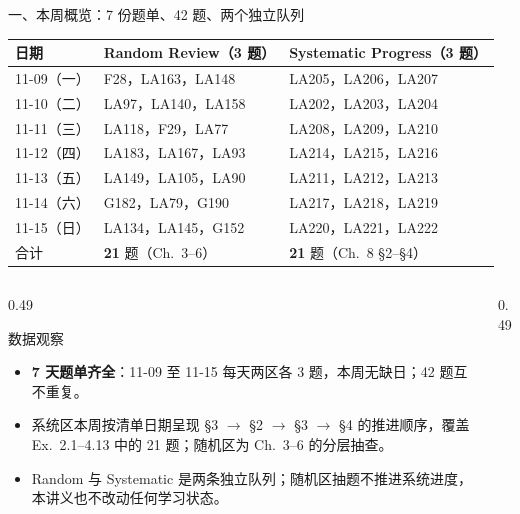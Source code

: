 \documentclass[aspectratio=169,10pt,fontset=none]{ctexbeamer}
\begin{document}
\begin{frame}[t]{一、本周概览：7 份题单、42 题、两个独立队列}
  \label{sec:overview}
  \centering
  \scriptsize
  \setlength{\tabcolsep}{3pt}
  \renewcommand{\arraystretch}{1.14}
  \begin{tabular}{@{}l l l@{}}
    \toprule
    日期 & Random Review（3 题） & Systematic Progress（3 题）\\
    \midrule
    11-09（一） & F28，LA163，LA148 & LA205，LA206，LA207\\
    11-10（二） & LA97，LA140，LA158 & LA202，LA203，LA204\\
    11-11（三） & LA118，F29，LA77 & LA208，LA209，LA210\\
    11-12（四） & LA183，LA167，LA93 & LA214，LA215，LA216\\
    11-13（五） & LA149，LA105，LA90 & LA211，LA212，LA213\\
    \rowcolor{ink!7} 11-14（六） & G182，LA79，G190 & LA217，LA218，LA219\\
    \rowcolor{ink!7} 11-15（日） & LA134，LA145，G152 & LA220，LA221，LA222\\
    \midrule
    合计 & \textbf{21} 题（Ch.~3--6） & \textbf{21} 题（Ch.~8 \S2--\S4）\\
    \bottomrule
  \end{tabular}
  \vspace{0.35em}
  \raggedright
  \begin{columns}[T,onlytextwidth]
    \begin{column}{0.49\textwidth}
      \begin{exampleblock}{\footnotesize 数据观察}
        \scriptsize
        \begin{itemize}\setlength{\itemsep}{1pt}
          \item \textbf{7 天题单齐全}：11-09 至 11-15 每天两区各 3 题，本周无缺日；42 题互不重复。
          \item 系统区本周按清单日期呈现 \S3 $\to$ \S2 $\to$ \S3 $\to$ \S4 的推进顺序，覆盖 Ex.~2.1--4.13 中的 21 题；随机区为 Ch.~3--6 的分层抽查。
          \item Random 与 Systematic 是两条独立队列；随机区抽题不推进系统进度，本讲义也不改动任何学习状态。
        \end{itemize}
      \end{exampleblock}
    \end{column}
    \begin{column}{0.49\textwidth}

\end{column}
\end{columns}
\end{frame}
\end{document}

